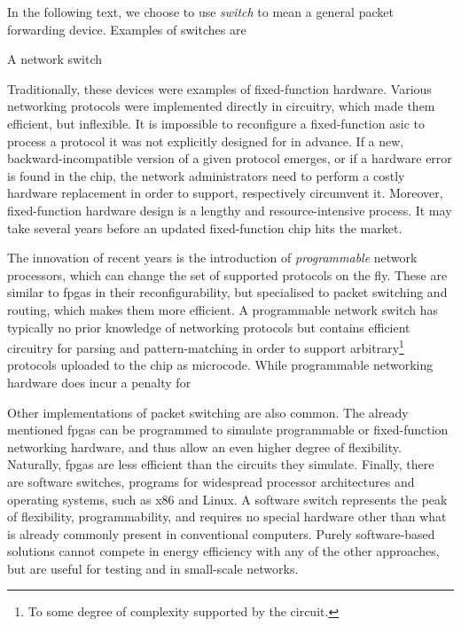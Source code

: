 In the following text, we choose to use \emph{switch} to mean a general packet
forwarding device. Examples of switches are

A network switch

Traditionally, these devices were examples of fixed-function hardware. Various
networking protocols were implemented directly in circuitry, which made them
efficient, but inflexible. It is impossible to reconfigure a fixed-function
\acrshort{asic} to process a protocol it was not explicitly designed for in
advance. If a new, backward-incompatible version of a given protocol emerges, or
if a hardware error is found in the chip, the network administrators need to
perform a costly hardware replacement in order to support, respectively
circumvent it. Moreover, fixed-function hardware design is a lengthy and
resource-intensive process. It may take several years before an updated
fixed-function chip hits the market.

The innovation of recent years is the introduction of \emph{programmable}
network processors, which can change the set of supported protocols on the fly.
These are similar to \acrshort{fpga}s in their reconfigurability, but
specialised to packet switching and routing, which makes them more efficient. A
programmable network switch has typically no prior knowledge of networking
protocols but contains efficient circuitry for parsing and pattern-matching in
order to support arbitrary\footnote{To some degree of complexity supported by
the circuit.} protocols uploaded to the chip as microcode. While programmable
networking hardware does incur a penalty for

Other implementations of packet switching are also common. The already mentioned
\acrlong{fpga}s can be programmed to simulate programmable or fixed-function
networking hardware, and thus allow an even higher degree of flexibility.
Naturally, \acrshort{fpga}s are less efficient than the circuits they simulate.
Finally, there are software switches, programs for widespread processor
architectures and operating systems, such as x86 and Linux. A software switch
represents the peak of flexibility, programmability, and requires no special
hardware other than what is already commonly present in conventional computers.
Purely software-based solutions cannot compete in energy efficiency with any of
the other approaches, but are useful for testing and in small-scale networks.

